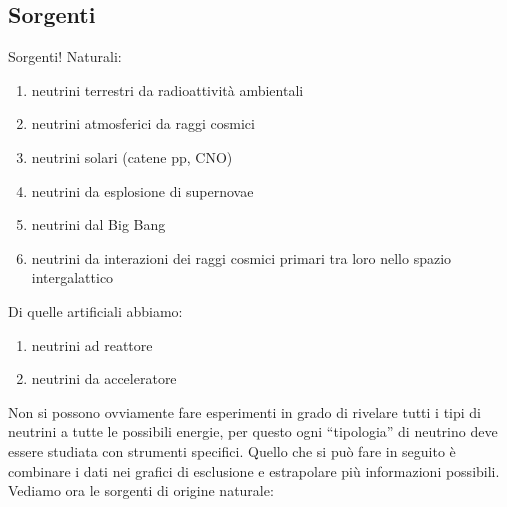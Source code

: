         \subsection{Sorgenti}
            Sorgenti! Naturali:
            \begin{enumerate}
                \item neutrini terrestri da radioattività ambientali
                \item neutrini atmosferici da raggi cosmici
                \item neutrini solari (catene pp, CNO)
                \item neutrini da esplosione di supernovae
                \item neutrini dal Big Bang 
                \item neutrini da interazioni dei raggi cosmici primari tra loro nello spazio intergalattico
            \end{enumerate}
            Di quelle artificiali abbiamo:
            \begin{enumerate}
                \item neutrini ad reattore
                \item neutrini da acceleratore
            \end{enumerate}
            Non si possono ovviamente fare esperimenti in grado di rivelare tutti i tipi di neutrini a tutte le possibili energie, per questo ogni ``tipologia'' di neutrino deve essere studiata con strumenti specifici. Quello che si può fare in seguito è combinare i dati nei grafici di esclusione e estrapolare più informazioni possibili. Vediamo ora le sorgenti di origine naturale:
